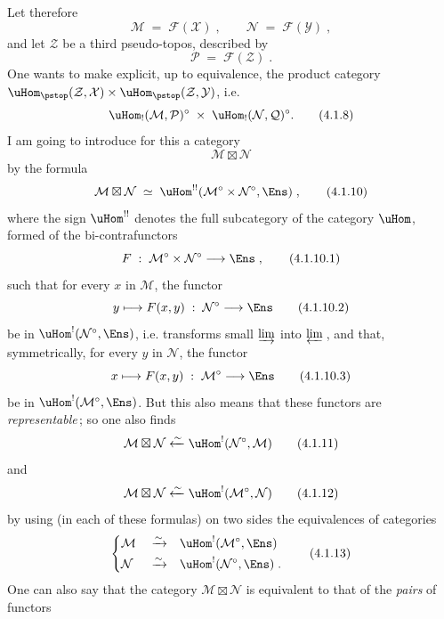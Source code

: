 Let therefore
\[
\mathcal{M} \;=\; \mathcal{F}(\mathcal{X})\;, \qquad \mathcal{N} \;=\; \mathcal{F}(\mathcal{Y})\;,
\tag*{(4.1.6)}
\]
and let $\mathcal{Z}$ be a third pseudo-topos, described by
\[
\mathcal{P} \;=\; \mathcal{F}(\mathcal{Z})\;.
\tag*{(4.1.7)}
\]
One wants to make explicit, up to equivalence, the product category $\uHom_{\pstop}(\mathcal{Z},\mathcal{X})\times\uHom_{\pstop}(\mathcal{Z},\mathcal{Y})$, i.e.
\[
\uHom_!(\mathcal{M},\mathcal{P})^\circ \;\times\; \uHom_!(\mathcal{N},\mathcal{Q})^\circ.
\tag*{(4.1.8)}
\] %
I am going to introduce for this a category
\[
\mathcal{M}\boxtimes\mathcal{N}
\tag*{(4.1.9)}
\]
by the formula
\[
\mathcal{M}\boxtimes\mathcal{N} \;\simeq\; \uHom^{!!}(\mathcal{M}^\circ\times\mathcal{N}^\circ,\Ens)\;,
\tag*{(4.1.10)}
\]
where the sign $\uHom^{!!}$ denotes the full subcategory of the category $\uHom$, formed of the bi-contrafunctors %
\[
F \;:\; \mathcal{M}^\circ\times\mathcal{N}^\circ \longrightarrow \Ens\;,
\tag*{(4.1.10.1)}
\]
such that for every $x$ in $\mathcal{M}$, the functor
\[
y \longmapsto F(x,y) \;:\; \mathcal{N}^\circ \longrightarrow \Ens
\tag*{(4.1.10.2)}
\]
be in $\uHom^!(\mathcal{N}^\circ,\Ens)$, i.e. transforms small $\varinjlim$ into $\varprojlim$\,, and that, symmetrically, for every $y$ in $\mathcal{N}$, the functor
\[
x \longmapsto F(x,y) \;:\; \mathcal{M}^\circ \longrightarrow \Ens
\tag*{(4.1.10.3)}
\]
be in $\uHom^!(\mathcal{M}^\circ,\Ens)$. But this also means that these functors are \textit{representable}\,; so one also finds
\[
\mathcal{M}\boxtimes\mathcal{N} \xleftarrow{\sim} \uHom^!(\mathcal{N}^\circ,\mathcal{M})
\tag*{(4.1.11)}
\]
and
\[
\mathcal{M}\boxtimes\mathcal{N} \xleftarrow{\sim} \uHom^!(\mathcal{M}^\circ,\mathcal{N})
\tag*{(4.1.12)}
\]
by using (in each of these formulas) on two sides the equivalences of categories
\[
\left\{
\begin{aligned}
&\mathcal{M} &&\xrightarrow{\sim} &&\uHom^!(\mathcal{M}^\circ,\Ens)\\
&\mathcal{N} &&\xrightarrow{\sim} &&\uHom^!(\mathcal{N}^\circ,\Ens)\;.
\end{aligned}
\right.
\tag*{(4.1.13)}
\]
One can also say that the category $\mathcal{M}\boxtimes\mathcal{N}$ is equivalent to that of the \textit{pairs} of functors
